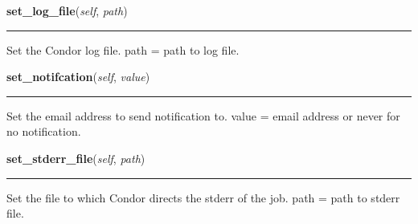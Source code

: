     \label{pipeline:CondorJob:set_log_file}
    \vspace{0.5ex}

    \noindent\begin{boxedminipage}{\textwidth}

    \raggedright \textbf{set\_log\_file}(\textit{self}, \textit{path})

    \vspace{-1.5ex}

    \rule{\textwidth}{0.5\fboxrule}
    Set the Condor log file. path = path to log file.

    \vspace{1ex}

    \end{boxedminipage}

    \label{pipeline:CondorJob:set_notifcation}
    \vspace{0.5ex}

    \noindent\begin{boxedminipage}{\textwidth}

    \raggedright \textbf{set\_notifcation}(\textit{self}, \textit{value})

    \vspace{-1.5ex}

    \rule{\textwidth}{0.5\fboxrule}
    Set the email address to send notification to. value = email address 
    or never for no notification.

    \vspace{1ex}

    \end{boxedminipage}

    \label{pipeline:CondorJob:set_stderr_file}
    \vspace{0.5ex}

    \noindent\begin{boxedminipage}{\textwidth}

    \raggedright \textbf{set\_stderr\_file}(\textit{self}, \textit{path})

    \vspace{-1.5ex}

    \rule{\textwidth}{0.5\fboxrule}
    Set the file to which Condor directs the stderr of the job. path = 
    path to stderr file.

    \vspace{1ex}

    \end{boxedminipage}

